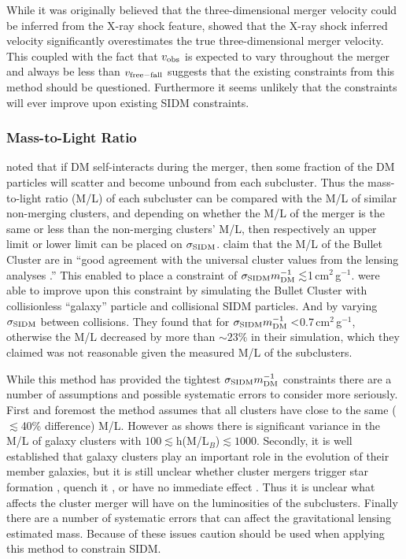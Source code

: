 While it was originally believed that the three-dimensional merger velocity could be inferred from the X-ray shock feature, \citet{Springel:2007bg} showed that the X-ray shock inferred velocity significantly overestimates the true three-dimensional merger velocity.
This coupled with the fact that $v_{\rm obs}$ is expected to vary throughout the merger and always be less than $v_{\rm free-fall}$ suggests that the existing constraints from this method should be questioned.
Furthermore it seems unlikely that the constraints will ever improve upon existing SIDM constraints.

\subsubsection{Mass-to-Light Ratio}\label{section:MLR}

\citet{Markevitch:2004dl} noted that if DM self-interacts during the merger, then some fraction of the DM particles will scatter and become unbound from each subcluster.
Thus the mass-to-light ratio (M/L) of each subcluster can be compared with the M/L of similar non-merging clusters, and depending on whether the M/L of the merger is the same or less than the non-merging clusters' M/L, then respectively an upper limit or lower limit can be placed on $\sigma_{\rm SIDM}$.
\citet{Clowe:2004eq} claim that the M/L of the Bullet Cluster are in ``good agreement with the universal cluster values from the lensing analyses \citep[e.g.,][]{Mellier:1999dh, Dahle:2000uz}.''
This enabled \citet{Markevitch:2004dl} to place a constraint of $\sigma_{\rm SIDM}m^{-1}_{\rm DM} \lesssim$1\,cm$^2$\,g$^{-1}$.
\citet{Randall:2008hs} were able to improve upon this constraint by simulating the Bullet Cluster with collisionless ``galaxy'' particle and collisional SIDM particles.
And by varying $\sigma_{\rm SIDM}$ between collisions.
They found that for $\sigma_{\rm SIDM}m^{-1}_{\rm DM} <$0.7\,cm$^2$\,g$^{-1}$, otherwise the M/L decreased by more than $\sim 23\%$ in their simulation, which they claimed was not reasonable given the measured M/L of the subclusters.

While this method has provided the tightest  $\sigma_{\rm SIDM}m^{-1}_{\rm DM} $ constraints there are a number of assumptions and possible systematic errors to consider more seriously.
First and foremost the method assumes that all clusters have close to the same ($\lesssim$40\% difference) M/L.
However as \citet{Dahle:2000uz} shows there is significant variance in the M/L of galaxy clusters with $100 \lesssim$h(M/L$_B$)$\lesssim 1000$. 
Secondly, it is well established that galaxy clusters play an important role in the evolution of their member galaxies, but it is still unclear whether cluster mergers trigger star formation \citep[e.g.][]{Miller:2003kx,Owen:2005dx,Ferrari:2005es,Hwang:2009ip}, quench it \citep{Poggianti:2004ca}, or have no immediate effect \citep{Chung:2010ds}.
Thus it is unclear what affects the cluster merger will have on the luminosities of the subclusters.
Finally there are a number of systematic errors \citep[][discuss several]{Noh:2010vt, Randall:2008hs} that can affect the gravitational lensing estimated mass. 
Because of these issues caution should be used when applying this method to constrain SIDM.

